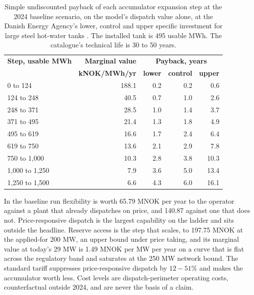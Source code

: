 \begin{table}[htbp]
\centering
\caption{Simple undiscounted payback of each accumulator expansion step at the 2024 baseline scenario, on the model's dispatch value alone, at the Danish Energy Agency's lower, control and upper specific investment for large steel hot-water tanks \cite{danish_energy_agency_energy_2025}. The installed tank is 495 usable MWh. The catalogue's technical life is 30 to 50 years.}
\small
\begin{tabular}{l r r r r}
\toprule
\textbf{Step, usable MWh} & \textbf{Marginal value} & \multicolumn{3}{c}{\textbf{Payback, years}} \\
 & \textbf{kNOK/MWh/yr} & \textbf{lower} & \textbf{control} & \textbf{upper} \\
\midrule
0 to 124 & 188.1 & 0.2 & 0.2 & 0.6 \\
124 to 248 & 40.5 & 0.7 & 1.0 & 2.6 \\
248 to 371 & 28.5 & 1.0 & 1.4 & 3.7 \\
371 to 495 & 21.4 & 1.3 & 1.8 & 4.9 \\
495 to 619 & 16.6 & 1.7 & 2.4 & 6.4 \\
619 to 750 & 13.6 & 2.1 & 2.9 & 7.8 \\
750 to 1{,}000 & 10.3 & 2.8 & 3.8 & 10.3 \\
1{,}000 to 1{,}250 & 7.9 & 3.6 & 5.0 & 13.4 \\
1{,}250 to 1{,}500 & 6.6 & 4.3 & 6.0 & 16.1 \\
\bottomrule
\end{tabular}
\label{tab:4.2 storage payback}
\end{table}

\begin{keypoint}
In the baseline run flexibility is worth 65.79 MNOK per year to the operator against a plant that already dispatches on price, and 140.87 against one that does not. Price-responsive dispatch is the largest capability on the ladder and sits outside the headline. Reserve access is the step that scales, to 197.75 MNOK at the applied-for 200 MW, an upper bound under price taking, and its marginal value at today's 29 MW is 1.49 MNOK per MW per year on a curve that is flat across the regulatory band and saturates at the 250 MW network bound. The standard tariff suppresses price-responsive dispatch by $12 - 51\%$ and makes the accumulator worth less. Cost levels are dispatch-perimeter operating costs, counterfactual outside 2024, and are never the basis of a claim.
\end{keypoint}

